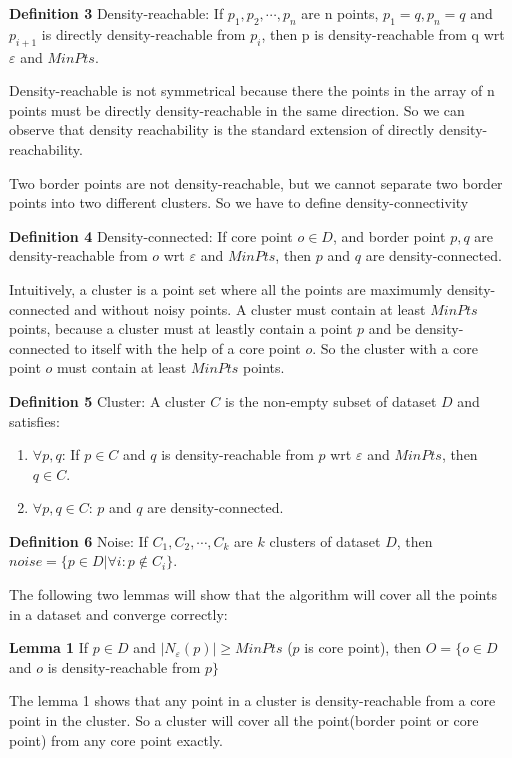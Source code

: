 \documentclass{article}
\begin{document}
\noindent\textbf{Definition 3} Density-reachable: If $p_1,p_2,\cdots,p_n$ are n points, $p_1=q,p_n=q$ and $p_{i+1}$ is directly density-reachable from $p_i$, then p is density-reachable from q wrt $\varepsilon$ and $MinPts$. 


Density-reachable is not symmetrical because there the points in the array of n points must be directly density-reachable in the same direction. So we can observe that density reachability is the standard extension of directly density-reachability.


Two border points are not density-reachable, but we cannot separate two border points into two different clusters. So we have to define density-connectivity


\noindent\textbf{Definition 4} Density-connected: If core point $o\in D$, and border point $p,q$ are density-reachable from $o$ wrt $\varepsilon$ and $MinPts$, then $p$ and $q$ are density-connected.


Intuitively, a cluster is a point set where all the points are maximumly density-connected and without noisy points. A cluster must contain at least $MinPts$ points, because a cluster must at leastly contain a point $p$ and be density-connected to itself with the help of a core point $o$. So the cluster with a core point $o$ must contain at least $MinPts$ points.


\noindent\textbf{Definition 5} Cluster: A cluster $C$ is the non-empty subset of dataset $D$ and satisfies:
\begin{enumerate}
\item $\forall p,q$: If $p\in C$ and $q$ is density-reachable from $p$ wrt $\varepsilon$ and $MinPts$, then $q\in C$.
\item $\forall p,q\in C$: $p$ and $q$ are density-connected.
\end{enumerate}
\noindent\textbf{Definition 6} Noise: If $C_1,C_2,\cdots,C_k$ are $k$ clusters of dataset $D$, then $noise = \{p\in D|\forall i:p\notin C_i\}$.


The following two lemmas will show that the algorithm will cover all the points in a dataset and converge correctly:


\noindent\textbf{Lemma 1} If $p\in D$ and $|N_\varepsilon(p)|\geq MinPts$ ($p$ is core point), then $O=\{o\in D $ and $ o $ is density-reachable from $ p\}$


The lemma 1 shows that any point in a cluster is density-reachable from a core point in the cluster. So a cluster will cover all the point(border point or core point) from any core point exactly.
\end{document}
